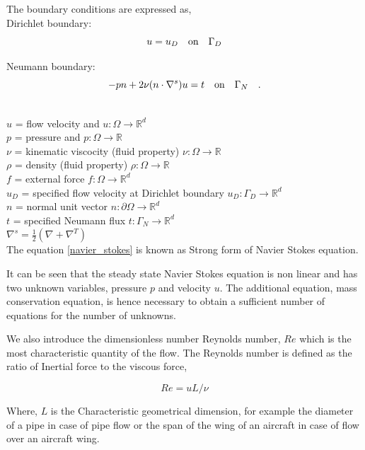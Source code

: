 \documentclass[a4paper,12pt]{book}
\begin{document}
The boundary conditions are expressed as,\\

Dirichlet boundary:
\begin{equation}\label{dirichlet_ns}
u=u_D \quad \textnormal{on} \quad \Gamma_D
\end{equation}

Neumann boundary:
\begin{equation} \label{neumann_ns}
-pn + 2\nu(n \cdot \nabla^s)u = t \quad   \textnormal{on}  \quad \Gamma_N \quad \textrm{.}
\end{equation}

$ $\\
$u$ = flow velocity and $u:\Omega \rightarrow \mathbb{R}^d$ \\
$p$ = pressure and $p:\Omega \rightarrow \mathbb{R}$\\
$\nu$ = kinematic viscocity (fluid property) $\nu:\Omega \rightarrow \mathbb{R}$\\ 
$\rho$ = density (fluid property) $\rho:\Omega \rightarrow \mathbb{R}$\\
$f$ = external force $f:\Omega \rightarrow \mathbb{R}^d$\\
$u_D$ = specified flow velocity at Dirichlet boundary $u_D:\Gamma_D \rightarrow \mathbb{R}^d$\\
$n$ = normal unit vector $n:\partial \Omega \rightarrow \mathbb{R}^d$\\
$t$ = specified Neumann flux $t:\Gamma_N \rightarrow \mathbb{R}^d$\\
$\nabla^s = \frac{1}{2}(\nabla + \nabla^T)$\\


The equation \eqref{navier_stokes} is known as Strong form of Navier Stokes equation.

It can be seen that the steady state Navier Stokes equation is non linear and has two unknown variables, pressure $p$ and velocity $u$. The additional equation, mass conservation equation, is hence necessary to obtain a sufficient number of equations for the number of unknowns.

We also introduce the dimensionless number Reynolds number, $Re$ which is the most characteristic quantity of the flow. The Reynolds number is defined as the ratio of Inertial force to the viscous force,

\begin{equation} \label{reynolds_number}
Re =  u L / \nu
\end{equation}

Where, $L$ is the Characteristic geometrical dimension, for example the diameter of a pipe in case of pipe flow or the span of the wing of an aircraft in case of flow over an aircraft wing.\\
\end{document}
